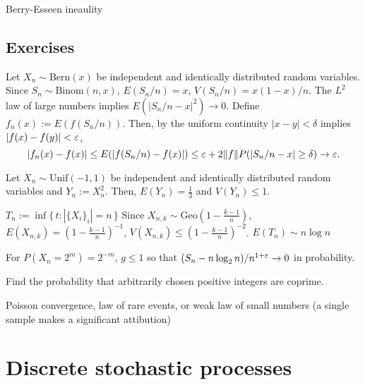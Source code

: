 \documentclass{../../large}
\newcommand{\Unif}{\mathrm{Unif}}
\newcommand{\Bern}{\mathrm{Bern}}
\newcommand{\Binom}{\mathrm{Binom}}
\newcommand{\Geo}{\mathrm{Geo}}
\begin{document}

Berry-Esseen ineaulity






\section*{Exercises}
\begin{prb}
Let $X_n\sim\Bern(x)$ be independent and identically distributed random variables.
Since $S_n\sim\Binom(n,x)$, $E(S_n/n)=x$, $V(S_n/n)=x(1-x)/n$.
The $L^2$ law of large numbers implies $E(|S_n/n-x|^2)\to0$.
Define $f_n(x):=E(f(S_n/n))$.
Then, by the uniform continuity $|x-y|<\delta$ implies $|f(x)-f(y)|<\varepsilon$,
\[|f_n(x)-f(x)|\le E(|f(S_n/n)-f(x)|)\le\varepsilon+2\|f\|P(|S_n/n-x|\ge\delta)\to\varepsilon.\]
\end{prb}
\begin{prb}
Let $X_n\sim\Unif(-1,1)$ be independent and identically distributed random variables and $Y_n:=X_n^2$.
Then, $E(Y_n)=\frac13$ and $V(Y_n)\le1$.
\end{prb}
\begin{prb}
$T_n:=\inf\{\,t:|\{X_i\}_i|=n\,\}$
Since $X_{n,k}\sim\Geo(1-\frac{k-1}n)$, $E(X_{n,k})=(1-\frac{k-1}n)^{-1}$, $V(X_{n,k})\le(1-\frac{k-1}n)^{-2}$.
$E(T_n)\sim n\log n$
\end{prb}
\begin{prb}
\end{prb}
\begin{prb}
For $P(X_n=2^m)=2^{-m}$, $g\le1$ so that $(S_n-n\log_2n)/n^{1+\varepsilon}\to0$ in probability.
\end{prb}

\begin{prb}
\end{prb}

\begin{prb}
Find the probability that arbitrarily chosen positive integers are coprime.
\end{prb}
Poisson convergence, law of rare events, or weak law of small numbers (a single sample makes a significant attibution)









\chapter{Discrete stochastic processes}
\end{document}
